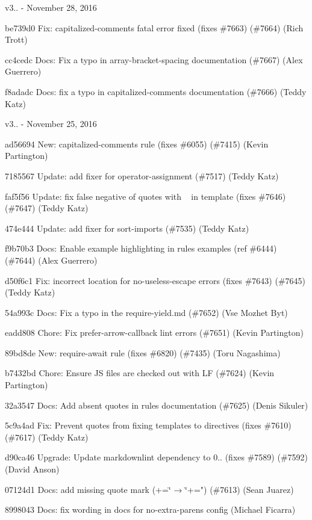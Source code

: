 v3.. -\/ November 28, 2016


\begin{DoxyItemize}
\item be739d0 Fix\+: capitalized-\/comments fatal error fixed (fixes \#7663) (\#7664) (Rich Trott)
\item cc4cedc Docs\+: Fix a typo in array-\/bracket-\/spacing documentation (\#7667) (Alex Guerrero)
\item f8adadc Docs\+: fix a typo in capitalized-\/comments documentation (\#7666) (Teddy Katz)
\end{DoxyItemize}

v3.. -\/ November 25, 2016


\begin{DoxyItemize}
\item ad56694 New\+: capitalized-\/comments rule (fixes \#6055) (\#7415) (Kevin Partington)
\item 7185567 Update\+: add fixer for {\ttfamily operator-\/assignment} (\#7517) (Teddy Katz)
\item faf5f56 Update\+: fix false negative of {\ttfamily quotes} with ~\newline
 in template (fixes \#7646) (\#7647) (Teddy Katz)
\item 474e444 Update\+: add fixer for {\ttfamily sort-\/imports} (\#7535) (Teddy Katz)
\item f9b70b3 Docs\+: Enable example highlighting in rules examples (ref \#6444) (\#7644) (Alex Guerrero)
\item d50f6c1 Fix\+: incorrect location for {\ttfamily no-\/useless-\/escape} errors (fixes \#7643) (\#7645) (Teddy Katz)
\item 54a993c Docs\+: Fix a typo in the require-\/yield.\+md (\#7652) (Vse Mozhet Byt)
\item eadd808 Chore\+: Fix prefer-\/arrow-\/callback lint errors (\#7651) (Kevin Partington)
\item 89bd8de New\+: {\ttfamily require-\/await} rule (fixes \#6820) (\#7435) (Toru Nagashima)
\item b7432bd Chore\+: Ensure JS files are checked out with LF (\#7624) (Kevin Partington)
\item 32a3547 Docs\+: Add absent quotes in rules documentation (\#7625) (Denis Sikuler)
\item 5c9a4ad Fix\+: Prevent {\ttfamily quotes} from fixing templates to directives (fixes \#7610) (\#7617) (Teddy Katz)
\item d90ca46 Upgrade\+: Update markdownlint dependency to 0.. (fixes \#7589) (\#7592) (David Anson)
\item 07124d1 Docs\+: add missing quote mark (+=\char`\"{} → \char`\"{}+=") (\#7613) (Sean Juarez)
\item 8998043 Docs\+: fix wording in docs for no-\/extra-\/parens config (Michael Ficarra)
\end{DoxyItemize}

